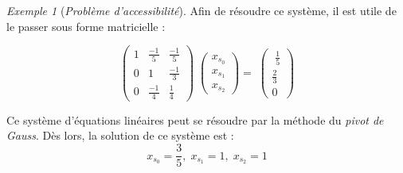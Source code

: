 \documentclass[12pt,a4paper]{report}
\theoremstyle{definition}%
\theoremstyle{remark}
\newtheorem{example}{Exemple}[chapter]
\begin{document}
\begin{example}[\textit{Problème d'accessibilité}]
	Afin de résoudre ce système, il est utile de le passer sous forme matricielle :

	\[
	\begin{pmatrix}
	1 & \frac{-1}{5} & \frac{-1}{5} \\[0.3em]
	0 & 1 & \frac{-1}{3}\\[0.3em]
	0 & \frac{-1}{4} & \frac{1}{4}
	\end{pmatrix}
	\;
	\begin{pmatrix}
	x_{s_0} \\[0.3em] x _{s_1} \\[0.3em] x_{s_2}
	\end{pmatrix}
	= \;
	\begin{pmatrix}
	\; \frac{1}{5} \\[0.3em] \frac{2}{3} \\[0.3em] 0
	\end{pmatrix}
	\]

	Ce système d'équations linéaires peut se résoudre par la méthode du \textit{pivot de Gauss}. %
	Dès lors, la solution de ce système est :
	\[
	x_{s_0} = \frac{3}{5}, \; x_{s_1} = 1, \; x_{s_2} = 1
	\]
\end{example}
\end{document}
